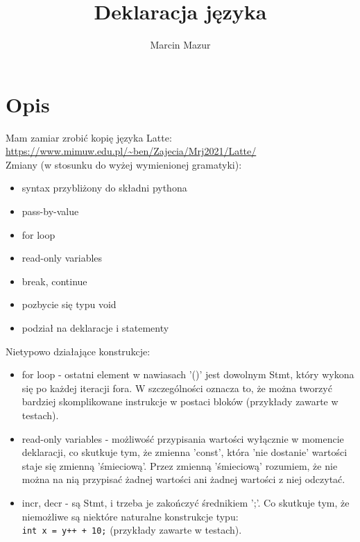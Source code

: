 \documentclass[a4paper]{article}
\title{Deklaracja języka}
\author{Marcin Mazur}
\begin{document}
\maketitle
\section{Opis}
Mam zamiar zrobić kopię języka Latte:\\
\url{https://www.mimuw.edu.pl/~ben/Zajecia/Mrj2021/Latte/} \\
Zmiany (w stosunku do wyżej wymienionej gramatyki):
\begin{itemize}
      \item syntax przybliżony do składni pythona
      \item pass-by-value
      \item for loop
      \item read-only variables
      \item break, continue
      \item pozbycie się typu void
      \item podział na deklaracje i statementy
\end{itemize}
Nietypowo działające konstrukcje:
\begin{itemize}
      \item for loop - ostatni element w nawiasach '()' jest dowolnym Stmt,
            który wykona się po każdej iteracji fora. W szczególności oznacza
            to, że można tworzyć bardziej skomplikowane instrukcje w postaci
            bloków (przykłady zawarte w testach).
      \item read-only variables - możliwość przypisania wartości wyłącznie
            w momencie deklaracji, co skutkuje tym, że zmienna 'const',
            która 'nie dostanie' wartości staje się zmienną 'śmieciową'.
            Przez zmienną 'śmieciową' rozumiem, że nie można na nią przypisać żadnej wartości
            ani żadnej wartości z niej odczytać.
      \item incr, decr - są Stmt, i trzeba je zakończyć średnikiem ';'. Co
            skutkuje tym, że niemożliwe są niektóre naturalne konstrukcje
            typu:\\ \texttt{int x = y++ + 10;} (przykłady zawarte w testach).
\end{itemize}
\end{document}
